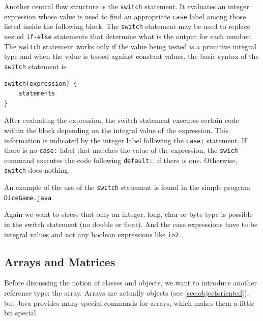 Another central flow structure is the \verb|switch| statement. It
evaluates an integer expression whose value is used to find an
appropriate \verb|case| label among those listed inside the following
block. The \verb|switch| statement may be used to replace nested \verb|if-else|
statements that determine what is the output for each number. The
\verb|switch| statement works only if the value being tested is a
primitive integral type and when the value is tested against constant
values. the basic syntax of the \verb|switch| statement is
\begin{verbatim}
switch(expression) {
    statements
}
\end{verbatim}
After evaluating the expression, the switch statement executes
certain code within the block depending on the integral value of the
expression. This information is indicated by the integer label following
the \verb|case:| statement. If there is no \verb|case:| label that
matches the value of the expression, the \verb|swich| command executes
the code following \verb|default:|, if there is one. Otherwise,
\verb|switch| does nothing.

An example of the use of the \verb|switch| statement is found in the
simple program \verb|DiceGame.java| 


Again we want to stress that only an integer, long, char or byte type
is possible in the switch statement (no double or float). And the
case expressions have to be integral values and not any boolean
expressions like \verb|i>2|. 


\subsection{Arrays and Matrices}
\label{sec:Arrays}

Before discussing the notion of classes and objects, we want to introduce
another reference type: the array. Arrays are actually objects
(see \ref{sec:objectoriented}), but
Java provides many special commands for arrays, which makes them a 
little bit special.


